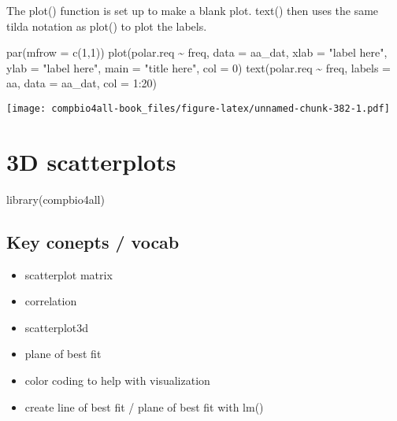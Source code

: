 \documentclass[
]{book}
\newenvironment{Shaded}{\begin{snugshade}}{\end{snugshade}}
\newcommand{\AttributeTok}[1]{\textcolor[rgb]{0.77,0.63,0.00}{#1}}
\newcommand{\DecValTok}[1]{\textcolor[rgb]{0.00,0.00,0.81}{#1}}
\newcommand{\FunctionTok}[1]{\textcolor[rgb]{0.00,0.00,0.00}{#1}}
\newcommand{\NormalTok}[1]{#1}
\newcommand{\SpecialCharTok}[1]{\textcolor[rgb]{0.00,0.00,0.00}{#1}}
\newcommand{\StringTok}[1]{\textcolor[rgb]{0.31,0.60,0.02}{#1}}
\providecommand{\tightlist}{%
  \setlength{\itemsep}{0pt}\setlength{\parskip}{0pt}}
\begin{document}
The plot() function is set up to make a blank plot. text() then uses the same tilda notation as plot() to plot the labels.

\begin{Shaded}
\begin{Highlighting}[]
\FunctionTok{par}\NormalTok{(}\AttributeTok{mfrow =} \FunctionTok{c}\NormalTok{(}\DecValTok{1}\NormalTok{,}\DecValTok{1}\NormalTok{))}
\FunctionTok{plot}\NormalTok{(polar.req  }\SpecialCharTok{\textasciitilde{}}\NormalTok{ freq, }\AttributeTok{data =}\NormalTok{ aa\_dat,}
     \AttributeTok{xlab =} \StringTok{"label here"}\NormalTok{,}
     \AttributeTok{ylab =} \StringTok{"label here"}\NormalTok{,}
     \AttributeTok{main =} \StringTok{"title here"}\NormalTok{,}
     \AttributeTok{col =} \DecValTok{0}\NormalTok{)}
\FunctionTok{text}\NormalTok{(polar.req }\SpecialCharTok{\textasciitilde{}}\NormalTok{ freq, }
     \AttributeTok{labels =}\NormalTok{ aa, }
     \AttributeTok{data =}\NormalTok{ aa\_dat, }
     \AttributeTok{col =} \DecValTok{1}\SpecialCharTok{:}\DecValTok{20}\NormalTok{)}
\end{Highlighting}
\end{Shaded}

\texttt{[image: compbio4all-book\_files/figure-latex/unnamed-chunk-382-1.pdf]}

\hypertarget{d-scatterplots}{%
\chapter{3D scatterplots}\label{d-scatterplots}}

\begin{Shaded}
\begin{Highlighting}[]
\FunctionTok{library}\NormalTok{(compbio4all)}
\end{Highlighting}
\end{Shaded}

\hypertarget{key-conepts-vocab}{%
\section{Key conepts / vocab}\label{key-conepts-vocab}}

\begin{itemize}
\tightlist
\item
  scatterplot matrix
\item
  correlation
\item
  scatterplot3d
\item
  plane of best fit
\item
  color coding to help with visualization
\item
  create line of best fit / plane of best fit with lm()
\end{itemize}
\end{document}

